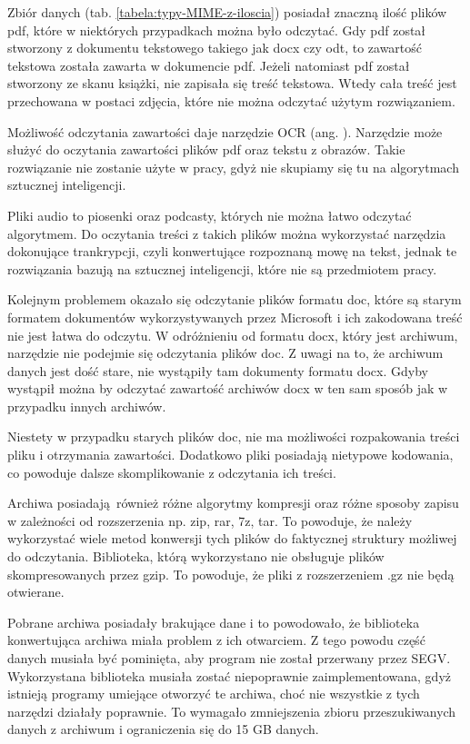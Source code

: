 Zbiór danych (tab. \ref{tabela:typy-MIME-z-iloscia}) posiadał znaczną ilość 
plików pdf, które w niektórych przypadkach można było odczytać. Gdy pdf został
stworzony z dokumentu tekstowego takiego jak docx czy odt, to zawartość tekstowa
została zawarta w dokumencie pdf. Jeżeli natomiast pdf został stworzony ze skanu
książki, nie zapisała się treść tekstowa. Wtedy cała treść jest przechowana w 
postaci zdjęcia, które nie można odczytać użytym rozwiązaniem.

Możliwość odczytania zawartości daje narzędzie OCR (ang. ).
Narzędzie może służyć do oczytania zawartości plików pdf oraz tekstu z obrazów.
Takie rozwiązanie nie zostanie użyte w pracy, gdyż nie skupiamy się tu na 
algorytmach sztucznej inteligencji.

Pliki audio to piosenki oraz podcasty, których nie można łatwo odczytać algorytmem.
Do oczytania treści z takich plików można wykorzystać narzędzia dokonujące 
trankrypcji, czyli konwertujące rozpoznaną mowę na tekst, jednak te rozwiązania bazują 
na sztucznej inteligencji, które nie są przedmiotem pracy.

Kolejnym problemem okazało się odczytanie plików formatu doc, które są starym 
formatem dokumentów wykorzystywanych przez Microsoft i ich zakodowana treść nie
jest łatwa do odczytu. W odróżnieniu od formatu docx, który jest archiwum, 
narzędzie nie podejmie się odczytania plików doc. Z uwagi na to, że archiwum danych
jest dość stare, nie wystąpiły tam dokumenty formatu docx. Gdyby wystąpił można
by odczytać zawartość archiwów docx w ten sam sposób jak w przypadku innych 
archiwów.

Niestety w przypadku starych plików doc, nie ma możliwości rozpakowania treści
pliku i otrzymania zawartości. Dodatkowo pliki posiadają nietypowe kodowania,
co powoduje dalsze skomplikowanie z odczytania ich treści.

Archiwa posiadają również różne algorytmy kompresji oraz różne sposoby zapisu w zależności od
rozszerzenia np. zip, rar, 7z, tar. To powoduje, że należy wykorzystać wiele
metod konwersji tych plików do faktycznej struktury możliwej do odczytania. 
Biblioteka, którą wykorzystano nie obsługuje plików skompresowanych przez gzip.
To powoduje, że pliki z rozszerzeniem .gz nie będą otwierane.

Pobrane archiwa posiadały brakujące dane i to powodowało, że biblioteka konwertująca
archiwa miała problem z ich otwarciem. Z tego powodu część danych musiała być 
pominięta, aby program nie został przerwany przez SEGV. Wykorzystana biblioteka
musiała zostać niepoprawnie zaimplementowana, gdyż istnieją programy umiejące 
otworzyć te archiwa, choć nie wszystkie z tych narzędzi działały poprawnie.
To wymagało zmniejszenia zbioru przeszukiwanych danych z archiwum i ograniczenia
się do 15 GB danych.

